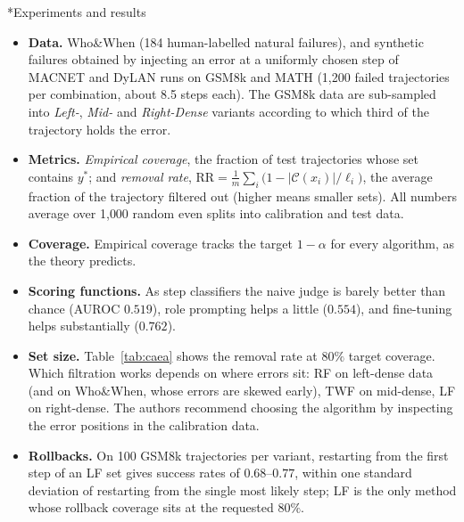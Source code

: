 \documentclass[11pt]{article}
\makeatletter
\theoremstyle{definition}
\renewcommand\subsection{\@startsection{subsection}{2}{\z@}{-3.25ex\@plus -1ex \@minus -.2ex}{1.5ex \@plus .2ex}{\normalfont\large\bfseries\color{secblue}}}
\newcommand{\C}{\mathcal{C}}
\newcommand{\ystar}{y^*}
\makeatother
\begin{document}
\subsection*{Experiments and results}
\begin{itemize}[leftmargin=1.5em]
\item \textbf{Data.} Who\&When (184 human-labelled natural failures), and synthetic failures obtained by injecting an error at a uniformly chosen step of MACNET and DyLAN runs on GSM8k and MATH (1{,}200 failed trajectories per combination, about 8.5 steps each). The GSM8k data are sub-sampled into \emph{Left-}, \emph{Mid-} and \emph{Right-Dense} variants according to which third of the trajectory holds the error.
\item \textbf{Metrics.} \emph{Empirical coverage}, the fraction of test trajectories whose set contains $\ystar$; and \emph{removal rate}, $\mathrm{RR}=\frac1m\sum_i\big(1-|\C(x_i)|/\ell_i\big)$, the average fraction of the trajectory filtered out (higher means smaller sets). All numbers average over 1{,}000 random even splits into calibration and test data.
\item \textbf{Coverage.} Empirical coverage tracks the target $1-\alpha$ for every algorithm, as the theory predicts.
\item \textbf{Scoring functions.} As step classifiers the naive judge is barely better than chance (AUROC $0.519$), role prompting helps a little ($0.554$), and fine-tuning helps substantially ($0.762$).
\item \textbf{Set size.} Table~\ref{tab:caea} shows the removal rate at $80\%$ target coverage. Which filtration works depends on where errors sit: RF on left-dense data (and on Who\&When, whose errors are skewed early), TWF on mid-dense, LF on right-dense. The authors recommend choosing the algorithm by inspecting the error positions in the calibration data.
\item \textbf{Rollbacks.} On 100 GSM8k trajectories per variant, restarting from the first step of an LF set gives success rates of $0.68$--$0.77$, within one standard deviation of restarting from the single most likely step; LF is the only method whose rollback coverage sits at the requested $80\%$.
\end{itemize}
\end{document}
